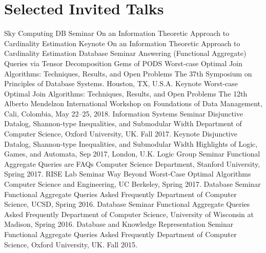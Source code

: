 \documentclass[10pt]{moderncv}
\begin{document}
\section{Selected Invited Talks}
{Sky Computing DB Seminar}
{On an Information Theoretic Approach to Cardinality Estimation}
{}{}
{}
{Keynote}
{On an Information Theoretic Approach to Cardinality Estimation}
{}{}
{}
{Database Seminar}
{Answering (Functional Aggregate) Queries via Tensor Decomposition}
{}{}
{}
{Gems of PODS}
{Worst-case Optimal Join Algorithms: Techniques, Results, and Open Problems}
{}{}
{The 37th Symposium on Principles of Database Systems.  Houston, TX, U.S.A.}
{Keynote}
{Worst-case Optimal Join Algorithms: Techniques, Results, and Open Problems}
{}{}
{The 12th Alberto Mendelzon International Workshop on Foundations of
Data Management, Cali, Colombia, May 22--25, 2018.}
{Information Systems Seminar}
{Disjunctive Datalog, Shannon-type Inequalities, and Submodular Width}
{}{}
{Department of Computer Science, Oxford University, UK. Fall 2017.}
{Keynote}
{Disjunctive Datalog, Shannon-type Inequalities, and Submodular Width}
{}{}
{Highlights of Logic, Games, and Automata, Sep 2017, London, U.K.}
{Logic Group Seminar}
{Functional Aggregate Queries are FAQs}
{}{}
{Computer Science Department, Stanford University, Spring 2017.}
{RISE Lab Seminar}
{Way Beyond Worst-Case Optimal Algorithms}
{}{}
{Computer Science and Engineering, UC Berkeley, Spring 2017.}
{Database Seminar}
{Functional Aggregate Queries Asked Frequently}
{}{}
{Department of Computer Science, UCSD, Spring 2016.}
{Database Seminar}
{Functional Aggregate Queries Asked Frequently}
{}{}
{Department of Computer Science, University of Wisconsin at Madison, Spring
2016.}
{Database and Knowledge Representation Seminar}
{Functional Aggregate Queries Asked Frequently}
{}{}
{Department of Computer Science, Oxford University, UK. Fall 2015.}
\end{document}
